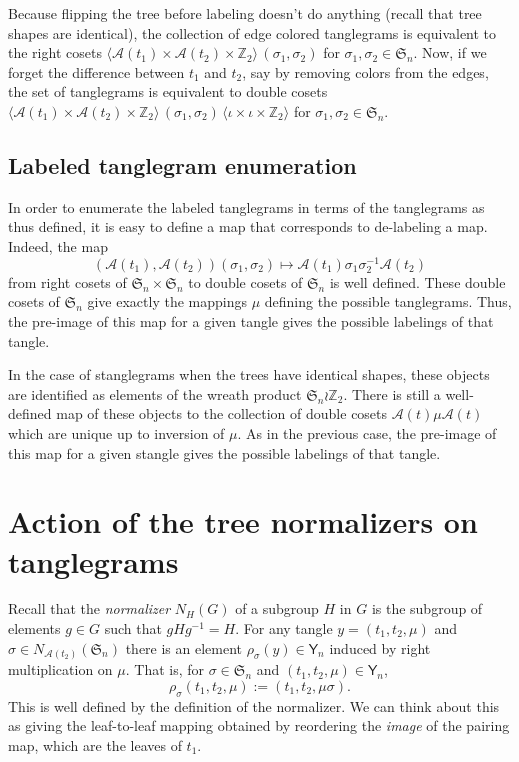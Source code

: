 \documentclass{amsart}
\newcommand{\ZZ}{\mathbb Z}
\newcommand{\fS}{\mathfrak S}
\newcommand{\aut}{\mathcal A}
\newcommand{\pairing}{\mu}
\newcommand{\tangle}{\mathsf{Y}}
\newcommand{\id}{\iota}
\newcommand{\wrtwo}{\wr \ZZ_2}
\begin{document}
Because flipping the tree before labeling doesn't do anything (recall that tree shapes are identical), the collection of edge colored tanglegrams is equivalent to the right cosets $\langle \aut(t_1) \times \aut(t_2) \times \ZZ_2 \rangle \, (\sigma_1, \sigma_2)$ for $\sigma_1, \sigma_2 \in \fS_n$.
Now, if we forget the difference between $t_1$ and $t_2$, say by removing colors from the edges, the set of tanglegrams is equivalent to double cosets
$\langle \aut(t_1) \times \aut(t_2) \times \ZZ_2 \rangle \, (\sigma_1, \sigma_2) \, \langle {\id} \times {\id} \times \ZZ_2 \rangle$ for $\sigma_1, \sigma_2 \in \fS_n$.


\subsection{Labeled tanglegram enumeration}
In order to enumerate the labeled tanglegrams in terms of the tanglegrams as thus defined, it is easy to define a map that corresponds to de-labeling a map.
Indeed, the map
\[
(\aut(t_1), \aut(t_2)) (\sigma_1, \sigma_2) \mapsto \aut(t_1) \sigma_1 \sigma_2^{-1} \aut(t_2)
\]
from right cosets of $\fS_n \times \fS_n$ to double cosets of $\fS_n$ is well defined.
These double cosets of $\fS_n$ give exactly the mappings $\pairing$ defining the possible tanglegrams.
Thus, the pre-image of this map for a given tangle gives the possible labelings of that tangle.

In the case of stanglegrams when the trees have identical shapes, these objects are identified as elements of the wreath product $\fS_n \wrtwo$.
There is still a well-defined map of these objects to the collection of double cosets $\aut(t) \pairing \aut(t)$ which are unique up to inversion of $\pairing$.
As in the previous case, the pre-image of this map for a given stangle gives the possible labelings of that tangle.


\section{Action of the tree normalizers on tanglegrams}
Recall that the \emph{normalizer} $N_H(G)$ of a subgroup $H$ in $G$ is the subgroup of elements $g \in G$ such that $gHg^{-1} = H$.
For any tangle $y = (t_1, t_2, \pairing)$ and $\sigma \in N_{\aut(t_2)}(\fS_n)$ there is an element $\rho_\sigma(y) \in \tangle_n$ induced by right multiplication on $\pairing$.
That is, for $\sigma \in \fS_n$ and $(t_1, t_2, \pairing) \in \tangle_n$,
\begin{equation}
\label{eq:action}
\rho_\sigma (t_1, t_2, \pairing) := (t_1, t_2, \pairing \sigma).
\end{equation}
This is well defined by the definition of the normalizer.
We can think about this as giving the leaf-to-leaf mapping obtained by reordering the \emph{image} of the pairing map, which are the leaves of $t_1$.
\end{document}
